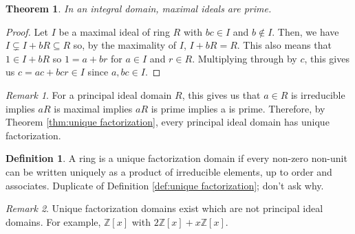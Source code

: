 \documentclass{article}
\newtheorem{theorem}{Theorem}[definition]
\theoremstyle{definition}
\newtheorem{definition}{Definition}[section]
\theoremstyle{remark}
\newtheorem{remark}{Remark}[definition]
\begin{document}
\begin{theorem}
    In an integral domain, maximal ideals are prime.
\end{theorem}

\begin{proof}
    Let $I$ be a maximal ideal of ring $R$ with $bc\in I$ and $b\notin I$.
    Then, we have $I\subsetneq I+bR\subseteq R$ so, by the maximality of $I$,
    $I+bR=R$.
    This also means that $1\in I+bR$ so $1=a+br$ for $a\in I$ and $r\in R$.
    Multiplying through by $c$, this gives us $c=ac+bcr\in I$ since $a,bc\in I$.
\end{proof}

\begin{remark}
    For a principal ideal domain $R$, this gives us that $a\in R$ is
    irreducible implies $aR$ is maximal implies $aR$ is prime implies a is prime.
    Therefore, by Theorem \ref{thm:unique factorization}, every principal ideal
    domain has unique factorization.
\end{remark}

\begin{definition}
    A ring is a unique factorization domain if every non-zero non-unit can be
    written uniquely as a product of irreducible elements, up to order and
    associates.
    Duplicate of Definition \ref{def:unique factorization}; don't ask why.
\end{definition}

\begin{remark}
    Unique factorization domains exist which are not principal ideal domains.
    For example, $\mathbb{Z}[x]$ with $2\mathbb{Z}[x]+x\mathbb{Z}[x]$.
\end{remark}
\end{document}
